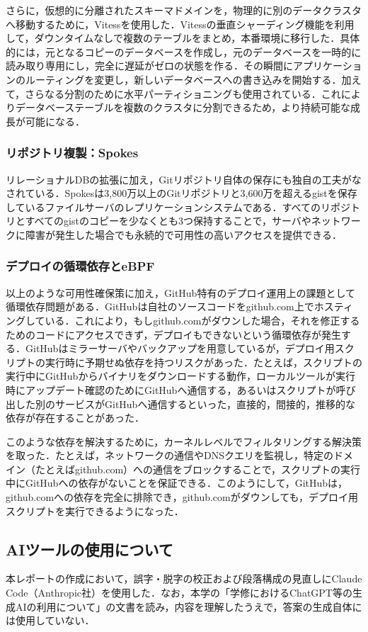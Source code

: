 \documentclass[a4paper,12pt]{article}
\begin{document}
さらに，仮想的に分離されたスキーマドメインを，物理的に別のデータクラスタへ移動するために，Vitessを使用した\cite{github-partitioning-db}．Vitessの垂直シャーディング機能を利用して，ダウンタイムなしで複数のテーブルをまとめ，本番環境に移行した．具体的には，元となるコピーのデータベースを作成し，元のデータベースを一時的に読み取り専用にし，完全に遅延がゼロの状態を作る．その瞬間にアプリケーションのルーティングを変更し，新しいデータベースへの書き込みを開始する．加えて，さらなる分割のために水平パーティショニングも使用されている．これによりデータベーステーブルを複数のクラスタに分割できるため，より持続可能な成長が可能になる．

\subsubsection{リポジトリ複製：Spokes}

リレーショナルDBの拡張に加え，Gitリポジトリ自体の保存にも独自の工夫がなされている．Spokesは3,800万以上のGitリポジトリと3,600万を超えるgistを保存しているファイルサーバのレプリケーションシステムである．すべてのリポジトリとすべてのgistのコピーを少なくとも3つ保持することで，サーバやネットワークに障害が発生した場合でも永続的で可用性の高いアクセスを提供できる\cite{github-spokes-resilience}．

\subsubsection{デプロイの循環依存とeBPF}

以上のような可用性確保策に加え，GitHub特有のデプロイ運用上の課題として循環依存問題がある．GitHubは自社のソースコードをgithub.com上でホスティングしている．これにより，もしgithub.comがダウンした場合，それを修正するためのコードにアクセスできず，デプロイもできないという循環依存が発生する．GitHubはミラーサーバやバックアップを用意しているが，デプロイ用スクリプトの実行時に予期せぬ依存を持つリスクがあった．たとえば，スクリプトの実行中にGitHubからバイナリをダウンロードする動作，ローカルツールが実行時にアップデート確認のためにGitHubへ通信する，あるいはスクリプトが呼び出した別のサービスがGitHubへ通信するといった，直接的，間接的，推移的な依存が存在することがあった．

このような依存を解決するために，カーネルレベルでフィルタリングする解決策を取った\cite{github-ebpf}．たとえば，ネットワークの通信やDNSクエリを監視し，特定のドメイン（たとえばgithub.com）への通信をブロックすることで，スクリプトの実行中にGitHubへの依存がないことを保証できる．このようにして，GitHubは，github.comへの依存を完全に排除でき，github.comがダウンしても，デプロイ用スクリプトを実行できるようになった．




\subsection*{AIツールの使用について}
本レポートの作成において，誤字・脱字の校正および段落構成の見直しにClaude Code（Anthropic社）を使用した．なお，本学の「学修におけるChatGPT等の生成AIの利用について」の文書を読み，内容を理解したうえで，答案の生成自体には使用していない．
\end{document}
